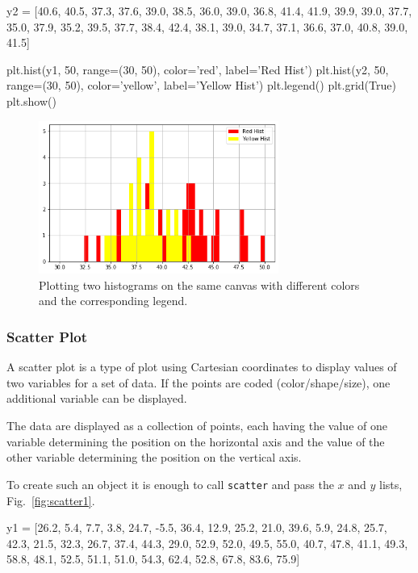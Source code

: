 \begin{ipython}
\begin{ipython}
y2 = [40.6, 40.5, 37.3, 37.6, 39.0, 38.5, 36.0, 
      39.0, 36.8, 41.4, 41.9, 39.9, 39.0, 37.7, 
      35.0, 37.9, 35.2, 39.5, 37.7, 38.4, 42.4, 
      38.1, 39.0, 34.7, 37.1, 36.6, 37.0, 40.8, 
      39.0, 41.5]

plt.hist(y1, 50, range=(30, 50), color='red', label='Red Hist')
plt.hist(y2, 50, range=(30, 50), color='yellow', label='Yellow Hist')
plt.legend()
plt.grid(True)
plt.show()
\end{ipython}

\begin{figure}[htb]
	\centering
	\includegraphics[width=0.7\textwidth]{figures/histo3}
	\caption{Plotting two histograms on the same canvas with different colors and the 
		corresponding legend.}
	\label{fig:histo3}
\end{figure}

\subsubsection{Scatter Plot}\label{scatter}

A scatter plot is a type of plot using Cartesian coordinates to display values of two variables for a set of data. If the points are coded (color/shape/size), one additional variable can be displayed.

The data are displayed as a collection of points, each having the value of one variable determining the position on the horizontal axis and the value of the other variable determining the position on the vertical axis.

To create such an object it is enough to call \texttt{scatter} and pass the \(x\) and \(y\) lists, Fig.~\ref{fig:scatter1}.

\begin{ipython}
y1 = [26.2, 5.4, 7.7, 3.8, 24.7, -5.5, 36.4, 12.9, 25.2, 21.0, 39.6,
      5.9, 24.8, 25.7, 42.3, 21.5, 32.3, 26.7, 37.4, 44.3, 29.0,
      52.9, 52.0, 49.5, 55.0, 40.7, 47.8, 41.1, 49.3, 58.8, 48.1,
      52.5, 51.1, 51.0, 54.3, 62.4, 52.8, 67.8, 83.6, 75.9]


\end{ipython}
\end{ipython}

